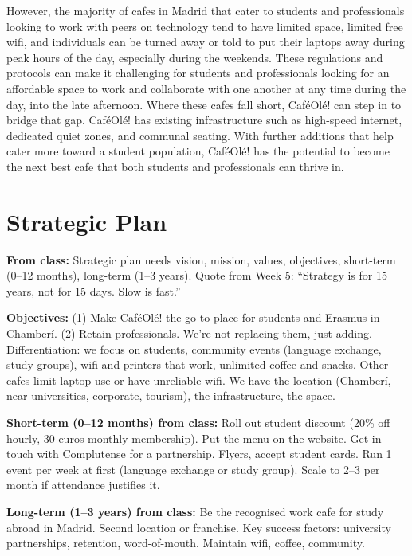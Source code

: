 \documentclass[12pt,a4paper]{article}
\begin{document}
However, the majority of cafes in Madrid that cater to students and professionals looking to work with peers on technology tend to have limited space, limited free wifi, and individuals can be turned away or told to put their laptops away during peak hours of the day, especially during the weekends. These regulations and protocols can make it challenging for students and professionals looking for an affordable space to work and collaborate with one another at any time during the day, into the late afternoon. Where these cafes fall short, Caf\'eOl\'e! can step in to bridge that gap. Caf\'eOl\'e! has existing infrastructure such as high-speed internet, dedicated quiet zones, and communal seating. With further additions that help cater more toward a student population, Caf\'eOl\'e! has the potential to become the next best cafe that both students and professionals can thrive in.

\vspace{0.5em}
\noindent{\color{sectionblue}\rule{\textwidth}{0.4pt}}

\section*{\color{sectionblue}Strategic Plan}\label{sec:strategy}

\textbf{From class:} Strategic plan needs vision, mission, values, objectives, short-term (0--12 months), long-term (1--3 years). Quote from Week 5: ``Strategy is for 15 years, not for 15 days. Slow is fast.''

\textbf{Objectives:} (1) Make Caf\'eOl\'e! the go-to place for students and Erasmus in Chamber\'i. (2) Retain professionals. We're not replacing them, just adding. Differentiation: we focus on students, community events (language exchange, study groups), wifi and printers that work, unlimited coffee and snacks. Other cafes limit laptop use or have unreliable wifi. We have the location (Chamber\'i, near universities, corporate, tourism), the infrastructure, the space.

\textbf{Short-term (0--12 months) from class:} Roll out student discount (20\% off hourly, 30 euros monthly membership). Put the menu on the website. Get in touch with Complutense for a partnership. Flyers, accept student cards. Run 1 event per week at first (language exchange or study group). Scale to 2--3 per month if attendance justifies it.

\textbf{Long-term (1--3 years) from class:} Be the recognised work cafe for study abroad in Madrid. Second location or franchise. Key success factors: university partnerships, retention, word-of-mouth. Maintain wifi, coffee, community.
\end{document}
